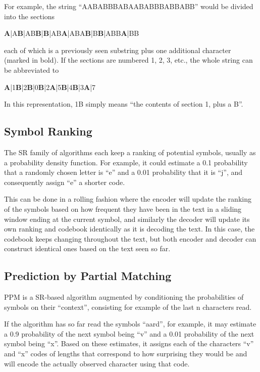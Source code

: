 For example, the string “AABABBBABAABABBBABBABB” would be divided into the sections

\begin{center}
\textbf{A}|A\textbf{B}|AB\textbf{B}|\textbf{B}|AB\textbf{A}|ABA\textbf{B}|B\textbf{B}|ABB\textbf{A}|BB
\end{center}

each of which is a previously seen substring plus one additional character (marked in bold). If the sections are numbered 1, 2, 3, etc., the whole string can be abbreviated to

\begin{center}
\textbf{A}|1\textbf{B}|2\textbf{B}|0\textbf{B}|2\textbf{A}|5\textbf{B}|4\textbf{B}|3\textbf{A}|7
\end{center}

In this representation, 1B simply means “the contents of section 1, plus a B”.


\subsection*{Symbol Ranking}
The SR family of algorithms each keep a ranking of potential symbols, usually as a probability density function. For example, it could estimate a 0.1 probability that a randomly chosen letter is “e” and a 0.01 probability that it is “j”, and consequently assign “e” a shorter code.

This can be done in a rolling fashion where the encoder will update the ranking of the symbols based on how frequent they have been in the text in a sliding window ending at the current symbol, and similarly the decoder will update its own ranking and codebook identically as it is decoding the text. In this case, the codebook keeps changing throughout the text, but both encoder and decoder can construct identical ones based on the text seen so far. 

\subsection*{Prediction by Partial Matching}
PPM is a SR-based algorithm augmented by conditioning the probabilities of symbols on their “context”, consisting for example of the last n characters read.

If the algorithm has so far read the symbols “aard”, for example, it may estimate a 0.9 probability of the next symbol being “v” and a 0.01 probability of the next symbol being “x”. Based on these estimates, it assigns each of the characters “v” and “x” codes of lengths that correspond to how surprising they would be and will encode the actually observed character using that code.

